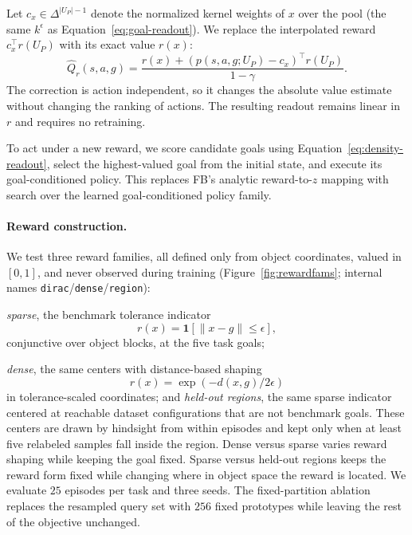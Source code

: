 \documentclass{article}
\newcommand{\ind}[1]{\mathbf{1}\!\left[#1\right]}
\begin{document}
Let $ c_x\in\Delta^{|U_P|-1}$ denote the normalized kernel weights of $x$ over the pool (the same $k^\epsilon$ as Equation~\ref{eq:goal-readout}).
We replace the interpolated reward $c_x^\top r(U_P)$ with its exact value $r(x)$:
\begin{equation}
\label{eq:density-readout}
    \widehat Q_r(s,a,g) = \frac{ r(x) + \left( p(s,a,g;U_P)-c_x \right)^\top r(U_P)}{1-\gamma}.
\end{equation}
The correction is action independent, so it changes the absolute value estimate without changing the ranking of actions.
The resulting readout remains linear in $r$ and requires no retraining.

To act under a new reward, we score candidate goals using Equation~\ref{eq:density-readout}, select the highest-valued goal from the initial state, and execute its goal-conditioned policy.
This replaces FB's analytic reward-to-$z$ mapping with search over the learned goal-conditioned policy family.

\paragraph{Reward construction.}
We test three reward families, all defined only from object coordinates, valued in $[0,1]$, and never observed during training (Figure~\ref{fig:rewardfams}; internal names \texttt{dirac}/\texttt{dense}/\texttt{region}):

\emph{sparse}, the benchmark tolerance indicator
\begin{equation}
    r(x) = \ind{\|x-g\|\le\epsilon},
\end{equation}
conjunctive over object blocks, at the five task goals;

\emph{dense}, the same centers with distance-based shaping
\begin{equation}
    r(x) = \exp(-d(x,g)/2\epsilon)
\end{equation}
in tolerance-scaled coordinates;
and \emph{held-out regions}, the same sparse indicator centered at reachable dataset configurations that are not benchmark goals.
These centers are drawn by hindsight from within episodes and kept only when at least five relabeled samples fall inside the region.
Dense versus sparse varies reward shaping while keeping the goal fixed.
Sparse versus held-out regions keeps the reward form fixed while changing where in object space the reward is located.
We evaluate $25$ episodes per task and three seeds.
The fixed-partition ablation replaces the resampled query set with $256$ fixed prototypes while leaving the rest of the objective unchanged.
\end{document}
